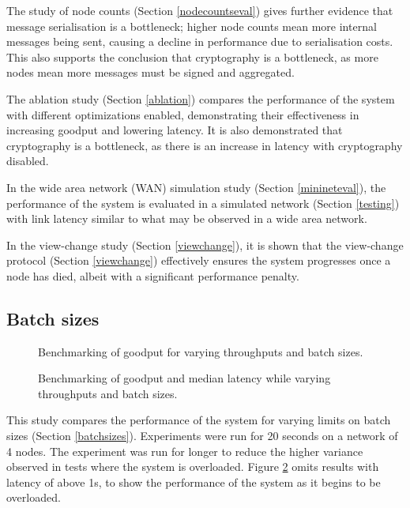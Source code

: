 The study of node counts (Section \ref{nodecountseval}) gives further evidence that message serialisation is a bottleneck; higher node counts mean more internal messages being sent, causing a decline in performance due to serialisation costs. This also supports the conclusion that cryptography is a bottleneck, as more nodes mean more messages must be signed and aggregated.

The ablation study (Section \ref{ablation}) compares the performance of the system with different optimizations enabled, demonstrating their effectiveness in increasing goodput and lowering latency. It is also demonstrated that cryptography is a bottleneck, as there is an increase in latency with cryptography disabled.

In the wide area network (WAN) simulation study (Section \ref{minineteval}), the performance of the system is evaluated in a simulated network (Section \ref{testing}) with link latency similar to what may be observed in a wide area network.

In the view-change study (Section \ref{viewchange}), it is shown that the view-change protocol (Section \ref{viewchange}) effectively ensures the system progresses once a node has died, albeit with a significant performance penalty.

\subsection{Batch sizes} \label{batchsizeseval}

\begin{figure}[h!]
\centering
\resizebox{.6\textwidth}{!}{}
\caption{Benchmarking of goodput for varying throughputs and batch sizes.}
\label{throughputgoodputbatch}
\end{figure}

\begin{figure}[h!]
\centering
\resizebox{.6\textwidth}{!}{}
\caption{Benchmarking of goodput and median latency while varying throughputs and batch sizes.}
\label{goodputlatencybatch}
\end{figure}

This study compares the performance of the system for varying limits on batch sizes (Section \ref{batchsizes}). Experiments were run for 20 seconds on a network of 4 nodes. The experiment was run for longer to reduce the higher variance observed in tests where the system is overloaded. Figure \ref{goodputlatencybatch} omits results with latency of above 1s, to show the performance of the system as it begins to be overloaded.


